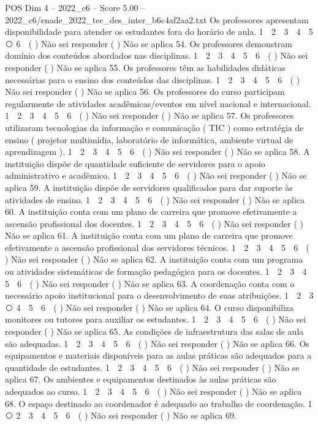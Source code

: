 \begin{textsample}{POS Dim 4 – 2022\_c6 – Score 5.00 – 2022\_c6/enade\_2022\_tec\_des\_inter\_b6c4af2aa2.txt}
Os professores apresentam disponibilidade para atender os estudantes fora do horário de aula. 1 ⃝ 2 ⃝ 3 ⃝ 4 ⃝ 5 ⃝ 6 ⃝ ( ) Não sei responder ( ) Não se aplica 54.
Os professores demonstram domínio dos conteúdos abordados nas disciplinas. 1 ⃝ 2 ⃝ 3 ⃝ 4 ⃝ 5 ⃝ 6 ⃝ ( ) Não sei responder ( ) Não se aplica 55.
Os professores têm as habilidades didáticas necessárias para o ensino dos conteúdos das disciplinas. 1 ⃝ 2 ⃝ 3 ⃝ 4 ⃝ 5 ⃝ 6 ⃝ ( ) Não sei responder ( ) Não se aplica 56.
Os professores do curso participam regularmente de atividades acadêmicas/eventos em nível nacional e internacional. 1 ⃝ 2 ⃝ 3 ⃝ 4 ⃝ 5 ⃝ 6 ⃝ ( ) Não sei responder ( ) Não se aplica 57.
Os professores utilizaram tecnologias da informação e comunicação ( TIC ) como estratégia de ensino ( projetor multimídia, laboratório de informática, ambiente virtual de aprendizagem ). 1 ⃝ 2 ⃝ 3 ⃝ 4 ⃝ 5 ⃝ 6 ⃝ ( ) Não sei responder ( ) Não se aplica 58.
A instituição dispõe de quantidade suficiente de servidores para o apoio administrativo e acadêmico. 1 ⃝ 2 ⃝ 3 ⃝ 4 ⃝ 5 ⃝ 6 ⃝ ( ) Não sei responder ( ) Não se aplica 59.
A instituição dispõe de servidores qualificados para dar suporte às atividades de ensino. 1 ⃝ 2 ⃝ 3 ⃝ 4 ⃝ 5 ⃝ 6 ⃝ ( ) Não sei responder ( ) Não se aplica 60.
A instituição conta com um plano de carreira que promove efetivamente a ascensão profissional dos docentes. 1 ⃝ 2 ⃝ 3 ⃝ 4 ⃝ 5 ⃝ 6 ⃝ ( ) Não sei responder ( ) Não se aplica 61.
A instituição conta com um plano de carreira que promove efetivamente a ascensão profissional dos servidores técnicos. 1 ⃝ 2 ⃝ 3 ⃝ 4 ⃝ 5 ⃝ 6 ⃝ ( ) Não sei responder ( ) Não se aplica 62.
A instituição conta com um programa ou atividades sistemáticas de formação pedagógica para os docentes. 1 ⃝ 2 ⃝ 3 ⃝ 4 ⃝ 5 ⃝ 6 ⃝ ( ) Não sei responder ( ) Não se aplica 63.
A coordenação conta com o necessário apoio institucional para o desenvolvimento de suas atribuições. 1 ⃝ 2 ⃝ 3 ⃝ 4 ⃝ 5 ⃝ 6 ⃝ ( ) Não sei responder ( ) Não se aplica 64.
O curso disponibiliza monitores ou tutores para auxiliar os estudantes. 1 ⃝ 2 ⃝ 3 ⃝ 4 ⃝ 5 ⃝ 6 ⃝ ( ) Não sei responder ( ) Não se aplica 65.
As condições de infraestrutura das salas de aula são adequadas. 1 ⃝ 2 ⃝ 3 ⃝ 4 ⃝ 5 ⃝ 6 ⃝ ( ) Não sei responder ( ) Não se aplica 66.
Os equipamentos e materiais disponíveis para as aulas práticas são adequados para a quantidade de estudantes. 1 ⃝ 2 ⃝ 3 ⃝ 4 ⃝ 5 ⃝ 6 ⃝ ( ) Não sei responder ( ) Não se aplica 67.
Os ambientes e equipamentos destinados às aulas práticas são adequados ao curso. 1 ⃝ 2 ⃝ 3 ⃝ 4 ⃝ 5 ⃝ 6 ⃝ ( ) Não sei responder ( ) Não se aplica 68.
O espaço destinado ao coordenador é adequado ao trabalho de coordenação. 1 ⃝ 2 ⃝ 3 ⃝ 4 ⃝ 5 ⃝ 6 ⃝ ( ) Não sei responder ( ) Não se aplica 69.

\end{textsample}
